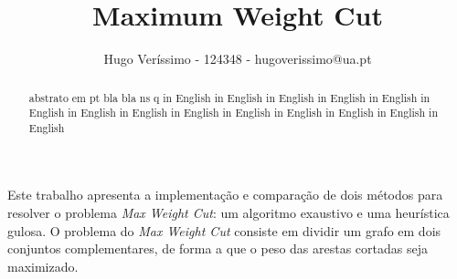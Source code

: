 \documentclass[mirror]{revdetua}
\begin{document}

\title{Maximum Weight Cut}
\author{Hugo Veríssimo - 124348 - hugoverissimo@ua.pt}
\maketitle

\begin{abstract}
abstrato em pt bla bla ns q in English  in English in English in English in English in English in English in English in English in English in English in English in English in English
\end{abstract}

\begin{resumo}
Este trabalho apresenta a implementação e comparação de dois métodos para resolver o problema \textit{Max Weight Cut}: um algoritmo exaustivo e uma heurística gulosa. O problema do \textit{Max Weight Cut} consiste em dividir um grafo em dois conjuntos complementares, de forma a que o peso das arestas cortadas seja maximizado. %


\end{resumo}
\end{document}
